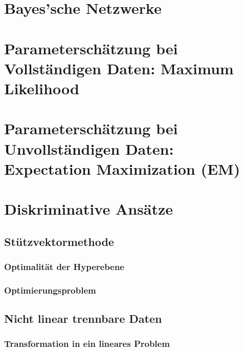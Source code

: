 	\section{Bayes'sche Netzwerke} %

	\section{Parameterschätzung bei Vollständigen Daten: Maximum Likelihood} %

	\section{Parameterschätzung bei Unvollständigen Daten: Expectation Maximization (EM)} %

	\section{Diskriminative Ansätze} %

		\subsection{Stützvektormethode} %

			\subsubsection{Optimalität der Hyperebene} %

			\subsubsection{Optimierungsproblem} %

		\subsection{Nicht linear trennbare Daten} %

			\subsubsection{Transformation in ein lineares Problem} %

